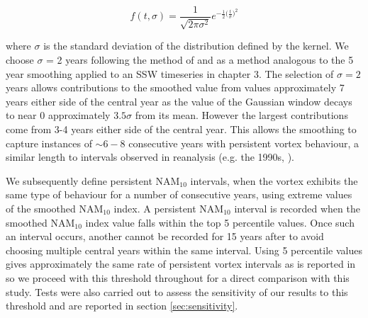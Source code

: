 \begin{equation} \label{Gaussian_filter}
f(t, \sigma) = \frac{1}{\sqrt{2 \pi \sigma^2}} e^{-\frac{1}{2}\big(\frac{t}{\sigma}\big)^2}
\end{equation}

where $\sigma$ is the standard deviation of the distribution defined by the kernel. We choose $\sigma$ = 2 years following the method of \cite{reichlerStratospheric2012} and as a method analogous to the 5 year smoothing applied to an SSW timeseries in chapter 3. The selection of $\sigma = 2$ years allows contributions to the smoothed value from values approximately 7 years either side of the central year as the value of the Gaussian window decays to near 0 approximately $3.5\sigma$ from its mean. However the largest contributions come from 3-4 years either side of the central year. This allows the smoothing to capture instances of $\sim 6-8$ consecutive years with persistent vortex behaviour, a similar length to intervals observed in reanalysis (e.g. the 1990s, \cite{pawsonCold1999b}). 

We subsequently define persistent NAM$_{10}$ intervals, when the vortex exhibits the same type of behaviour for a number of consecutive years, using extreme values of the smoothed NAM$_{10}$ index. A persistent NAM$_{10}$ interval is recorded when the smoothed NAM$_{10}$ index value falls within the top 5 percentile values. Once such an interval occurs, another cannot be recorded for 15 years after to avoid choosing multiple central years within the same interval. Using 5 percentile values gives approximately the same rate of persistent vortex intervals as is reported in \cite{reichlerStratospheric2012b} so we proceed with this threshold throughout for a direct comparison with this study. Tests were also carried out to assess the sensitivity of our results to this threshold and are reported in section \ref{sec:sensitivity}.

